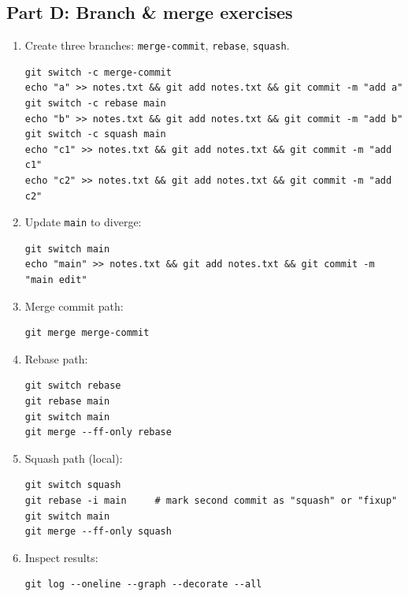 \documentclass[11pt]{article}
\begin{document}
\subsection*{Part D: Branch \& merge exercises}
\begin{enumerate}
  \item Create three branches: \texttt{merge-commit}, \texttt{rebase}, \texttt{squash}.
\begin{verbatim}
git switch -c merge-commit
echo "a" >> notes.txt && git add notes.txt && git commit -m "add a"
git switch -c rebase main
echo "b" >> notes.txt && git add notes.txt && git commit -m "add b"
git switch -c squash main
echo "c1" >> notes.txt && git add notes.txt && git commit -m "add c1"
echo "c2" >> notes.txt && git add notes.txt && git commit -m "add c2"
\end{verbatim}
  \item Update \texttt{main} to diverge:
\begin{verbatim}
git switch main
echo "main" >> notes.txt && git add notes.txt && git commit -m "main edit"
\end{verbatim}
  \item Merge commit path:
\begin{verbatim}
git merge merge-commit
\end{verbatim}
  \item Rebase path:
\begin{verbatim}
git switch rebase
git rebase main
git switch main
git merge --ff-only rebase
\end{verbatim}
  \item Squash path (local):
\begin{verbatim}
git switch squash
git rebase -i main     # mark second commit as "squash" or "fixup"
git switch main
git merge --ff-only squash
\end{verbatim}
  \item Inspect results:
\begin{verbatim}
git log --oneline --graph --decorate --all
\end{verbatim}
\end{enumerate}
\end{document}
